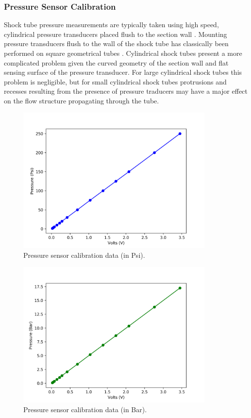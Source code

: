 \subsubsection{Pressure Sensor Calibration}

Shock tube pressure measurements are typically taken using high speed, cylindrical pressure transducers placed flush to the section wall \citep{knight1958piezoelectric}. Mounting pressure transducers flush to the wall of the shock tube has classically been performed on square geometrical tubes \citep{knight1958piezoelectric, anderson2000shock,ryu1995shock}. Cylindrical shock tubes present a more complicated problem given the curved geometry of the section wall and flat sensing surface of the pressure transducer. For large cylindrical shock tubes this problem is negligible, but for small cylindrical shock tubes protrusions and recesses resulting from the presence of pressure traducers may have a major effect on the flow structure propagating through the tube.


\begin{figure}[H] 
	\centering
	\includegraphics[width=0.88\textwidth]{pressure1.png} 
	\caption{Pressure sensor calibration data (in Psi).}
	\label{fig:hydro_test}
\end{figure}

\begin{figure}[H] 
	\centering
	\includegraphics[width=0.88\textwidth]{pressure2.png} 
	\caption{Pressure sensor calibration data (in Bar).}
	\label{fig:hydro_test}
\end{figure}

